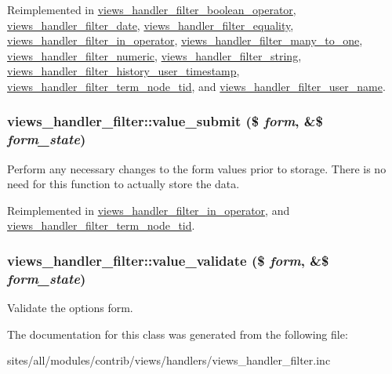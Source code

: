 Reimplemented in \hyperlink{classviews__handler__filter__boolean__operator_1680256640c960fef88ad1485cfb91f7}{views\_\-handler\_\-filter\_\-boolean\_\-operator}, \hyperlink{classviews__handler__filter__date_5c7fb298feef092a2cb3bc3f75f54f29}{views\_\-handler\_\-filter\_\-date}, \hyperlink{classviews__handler__filter__equality_5ef4270bd7b8fae32e024f6ca6e7a6b8}{views\_\-handler\_\-filter\_\-equality}, \hyperlink{classviews__handler__filter__in__operator_6736083657cad0f8c7299b000f2b8e60}{views\_\-handler\_\-filter\_\-in\_\-operator}, \hyperlink{classviews__handler__filter__many__to__one_6c5e3bbabc2ed73418f835195c10f451}{views\_\-handler\_\-filter\_\-many\_\-to\_\-one}, \hyperlink{classviews__handler__filter__numeric_b0888218590f7c620f10fc04a98d135e}{views\_\-handler\_\-filter\_\-numeric}, \hyperlink{classviews__handler__filter__string_41c2ed02d24685d046eccd9e751ad916}{views\_\-handler\_\-filter\_\-string}, \hyperlink{classviews__handler__filter__history__user__timestamp_38401d36304bef8a19184a8e7919427f}{views\_\-handler\_\-filter\_\-history\_\-user\_\-timestamp}, \hyperlink{classviews__handler__filter__term__node__tid_3259d8a91cb0c13c51c02942b267b131}{views\_\-handler\_\-filter\_\-term\_\-node\_\-tid}, and \hyperlink{classviews__handler__filter__user__name_08bc953c1682728eb0d38e5592a3286e}{views\_\-handler\_\-filter\_\-user\_\-name}.\hypertarget{classviews__handler__filter_e71b3b09b75932ec6a8db33d56d41035}{
\subsubsection[{value\_\-submit}]{\setlength{\rightskip}{0pt plus 5cm}views\_\-handler\_\-filter::value\_\-submit (\$ {\em form}, \/  \&\$ {\em form\_\-state})}}
\label{classviews__handler__filter_e71b3b09b75932ec6a8db33d56d41035}


Perform any necessary changes to the form values prior to storage. There is no need for this function to actually store the data. 

Reimplemented in \hyperlink{classviews__handler__filter__in__operator_f7b01b1f4e53aec7f4b1065606819624}{views\_\-handler\_\-filter\_\-in\_\-operator}, and \hyperlink{classviews__handler__filter__term__node__tid_48244c2456ac78e1855d9a48632ce045}{views\_\-handler\_\-filter\_\-term\_\-node\_\-tid}.\hypertarget{classviews__handler__filter_55b051bcd047b7251e6dbbece8e0a081}{
\subsubsection[{value\_\-validate}]{\setlength{\rightskip}{0pt plus 5cm}views\_\-handler\_\-filter::value\_\-validate (\$ {\em form}, \/  \&\$ {\em form\_\-state})}}
\label{classviews__handler__filter_55b051bcd047b7251e6dbbece8e0a081}


Validate the options form. 

The documentation for this class was generated from the following file:\begin{CompactItemize}
\item 
sites/all/modules/contrib/views/handlers/views\_\-handler\_\-filter.inc\end{CompactItemize}
